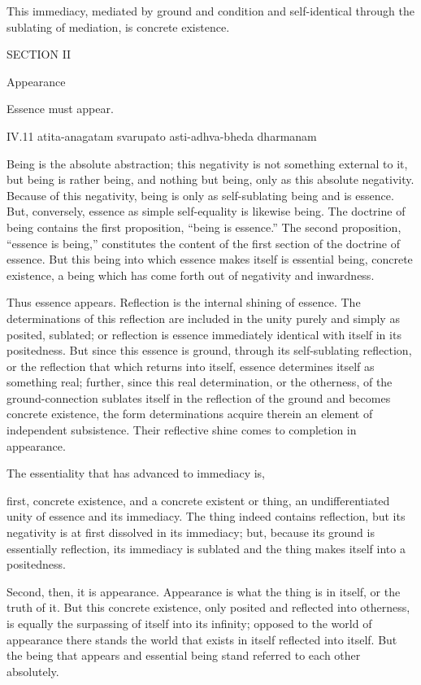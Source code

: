 This immediacy, mediated by ground and condition
and self-identical through the sublating of mediation,
is concrete existence.

SECTION II

Appearance

Essence must appear.

IV.11
atita-anagatam svarupato asti-adhva-bheda dharmanam

Being is the absolute abstraction;
this negativity is not something external to it,
but being is rather being,
and nothing but being,
only as this absolute negativity.
Because of this negativity,
being is only as self-sublating being
and is essence.
But, conversely,
essence as simple self-equality
is likewise being.
The doctrine of being contains
the first proposition, “being is essence.”
The second proposition, “essence is being,”
constitutes the content of the first section
of the doctrine of essence.
But this being into which
essence makes itself
is essential being,
concrete existence,
a being which has come forth
out of negativity and inwardness.

Thus essence appears.
Reflection is the internal shining of essence.
The determinations of this reflection are included
in the unity purely and simply as posited, sublated;
or reflection is essence immediately
identical with itself in its positedness.
But since this essence is ground,
through its self-sublating reflection,
or the reflection that which returns into itself,
essence determines itself as something real;
further, since this real determination, or the otherness,
of the ground-connection sublates itself
in the reflection of the ground
and becomes concrete existence,
the form determinations acquire therein
an element of independent subsistence.
Their reflective shine comes to completion in appearance.

The essentiality that has advanced to immediacy is,

first, concrete existence,
and a concrete existent or thing,
an undifferentiated unity of
essence and its immediacy.
The thing indeed contains reflection,
but its negativity is at first
dissolved in its immediacy;
but, because its ground is
essentially reflection,
its immediacy is sublated
and the thing makes itself
into a positedness.

Second, then, it is appearance.
Appearance is what the thing is in itself,
or the truth of it.
But this concrete existence,
only posited and reflected into otherness,
is equally the surpassing of itself into its infinity;
opposed to the world of appearance
there stands the world that exists
in itself reflected into itself.
But the being that appears and essential being
stand referred to each other absolutely.

